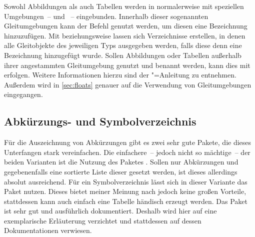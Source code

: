 \documentclass[%
  english,ngerman,%
  geometry=no,DIV=12,automark,%
]{tudscrartcl}
\begin{document}
Sowohl Abbildungen als auch Tabellen werden in  normalerweise 
mit speziellen Umgebungen~--  und ~-- 
eingebunden. Innerhalb dieser sogenannten Gleitumgebungen kann der Befehl 
 genutzt 
werden, um diesen eine Bezeichnung hinzuzufügen. Mit  
beziehungsweise  lassen sich Verzeichnisse erstellen, in 
denen alle Gleitobjekte des jeweiligen Typs ausgegeben werden, falls diese denn 
eine Bezeichnung hinzugefügt wurde. Sollen Abbildungen oder Tabellen außerhalb 
ihrer angestammten Gleitumgebung genutzt und benannt werden, kann dies mit
erfolgen. Weitere Informationen hierzu sind der \KOMAScript"=Anleitung 
\scrguide zu entnehmen. Außerdem wird in \autoref{sec:floats} genauer auf die 
Verwendung von Gleitumgebungen eingegangen.
%
\begin{Excerpt*}
\tableofcontents
\listoffigures
\listoftables
\end{Excerpt*}



\subsection{Abkürzungs- und Symbolverzeichnis}
\label{sec:glossaries}
Für die Auszeichnung von Abkürzungen gibt es zwei sehr gute Pakete, die dieses 
Unterfangen stark vereinfachen. Die einfachere~-- jedoch nicht so mächtige~-- 
der beiden Varianten ist die Nutzung des Paketes . Sollen nur 
Abkürzungen und gegebenenfalls eine sortierte Liste dieser gesetzt werden, ist 
dieses allerdings absolut ausreichend. Für ein Symbolverzeichnis lässt sich in 
dieser Variante das Paket  nutzen. Dieses bietet meiner 
Meinung nach jedoch keine großen Vorteile, stattdessen kann auch einfach eine 
Tabelle händisch erzeugt werden. Das Paket  ist sehr gut und 
ausführlich dokumentiert. Deshalb wird hier auf eine exemplarische Erläuterung 
verzichtet und stattdessen auf dessen Dokumentationen verwiesen.
\end{document}
